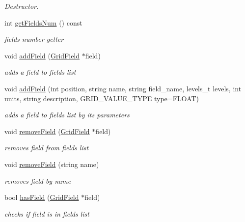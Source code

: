 \begin{DoxyCompactItemize}
\begin{DoxyCompactList}\small\item\em Destructor. \end{DoxyCompactList}\item 
int \hyperlink{classfwi_1_1grid_1_1GridFields_a1aefa6b58f76e2e5f0373a493bd28517}{get\-Fields\-Num} () const 
\begin{DoxyCompactList}\small\item\em fields number getter \end{DoxyCompactList}\item 
void \hyperlink{classfwi_1_1grid_1_1GridFields_ace69526746a7cdf0f356c4d635fd3359}{add\-Field} (\hyperlink{classfwi_1_1grid_1_1GridField}{Grid\-Field} $\ast$field)
\begin{DoxyCompactList}\small\item\em adds a field to fields list \end{DoxyCompactList}\item 
void \hyperlink{classfwi_1_1grid_1_1GridFields_a50301785fe0af270a3c4f0af2ee8f06b}{add\-Field} (int position, string name, string field\-\_\-name, levels\-\_\-t levels, int units, string description, G\-R\-I\-D\-\_\-\-V\-A\-L\-U\-E\-\_\-\-T\-Y\-P\-E type=F\-L\-O\-A\-T)
\begin{DoxyCompactList}\small\item\em adds a field to fields list by its parameters \end{DoxyCompactList}\item 
void \hyperlink{classfwi_1_1grid_1_1GridFields_aba88c89ac3a49a30927d91733a21bb5e}{remove\-Field} (\hyperlink{classfwi_1_1grid_1_1GridField}{Grid\-Field} $\ast$field)
\begin{DoxyCompactList}\small\item\em removes field from fields list \end{DoxyCompactList}\item 
void \hyperlink{classfwi_1_1grid_1_1GridFields_a1f9762a1ba30c23f7bf664df9be6c54d}{remove\-Field} (string name)
\begin{DoxyCompactList}\small\item\em removes field by name \end{DoxyCompactList}\item 
bool \hyperlink{classfwi_1_1grid_1_1GridFields_a86a81529ff06c2cba5666219679f176b}{has\-Field} (\hyperlink{classfwi_1_1grid_1_1GridField}{Grid\-Field} $\ast$field)
\begin{DoxyCompactList}\small\item\em checks if field is in fields list \end{DoxyCompactList}\item 

\end{DoxyCompactItemize}
